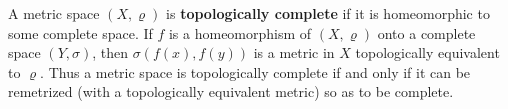 A metric space $(X, \varrho)$ is \textbf{topologically complete} if it is homeomorphic to some complete space. If $f$ is a homeomorphism of $(X, \varrho)$ onto a complete space $(Y, \sigma)$, then $\sigma(f(x), f(y))$ is a metric in $X$ topologically equivalent to $\varrho$. Thus a metric space is topologically complete if and only if it can be remetrized (with a topologically equivalent metric) so as to be complete.
